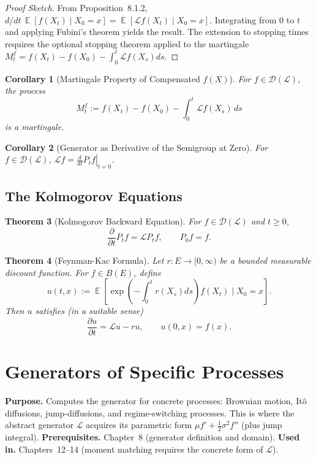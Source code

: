 \documentclass[11pt,a4paper,openany]{book}
\theoremstyle{definition}
\theoremstyle{plain}
\newtheorem{theorem}{Theorem}[chapter]
\newtheorem{corollary}[theorem]{Corollary}
\theoremstyle{remark}
\DeclareMathOperator{\E}{\mathbb{E}}
\newcommand{\1}{\mathbbm{1}}
\newcommand{\calL}{\mathcal{L}}
\newcommand{\calD}{\mathcal{D}}
\begin{document}
\begin{proof}[Proof Sketch]
From Proposition~8.1.2, $d/dt \, \E[f(X_{t}) \mid X_{0}=x] = \E[\calL f(X_{t}) \mid X_{0}=x]$. Integrating from $0$ to $t$ and applying Fubini's theorem yields the result. The extension to stopping times requires the optional stopping theorem applied to the martingale $M_{t}^{f} = f(X_{t}) - f(X_{0}) - \int_{0}^{t} \calL f(X_{s}) ds$.
\end{proof}

\begin{corollary}[Martingale Property of Compensated $f(X)$]
For $f \in \calD(\calL)$, the process
\[
M_{t}^{f} := f(X_{t}) - f(X_{0}) - \int_{0}^{t} \calL f(X_{s}) \, ds
\]
is a martingale.
\end{corollary}

\begin{corollary}[Generator as Derivative of the Semigroup at Zero]
For $f \in \calD(\calL)$, $\calL f = \left.\frac{d}{dt} P_{t} f\right|_{t=0}$.
\end{corollary}

\section{The Kolmogorov Equations}

\begin{theorem}[Kolmogorov Backward Equation]
For $f \in \calD(\calL)$ and $t \geq 0$,
\[
\frac{\partial}{\partial t} P_{t} f = \calL P_{t} f, \qquad P_{0}f = f.
\]
\end{theorem}

\begin{theorem}[Feynman-Kac Formula]
Let $r: E \to [0, \infty)$ be a bounded measurable discount function. For $f \in B(E)$, define
\[
u(t, x) := \E\left[\exp\left(-\int_{0}^{t} r(X_{s}) ds\right) f(X_{t}) \mid X_{0} = x\right].
\]
Then $u$ satisfies (in a suitable sense)
\[
\frac{\partial u}{\partial t} = \calL u - r u, \qquad u(0, x) = f(x).
\]
\end{theorem}

\chapter{Generators of Specific Processes}

\noindent\textbf{Purpose.} Computes the generator for concrete processes: Brownian motion, It\^{o} diffusions, jump-diffusions, and regime-switching processes. This is where the abstract generator $\mathcal{L}$ acquires its parametric form $\mu f' + \frac{1}{2}\sigma^{2} f''$ (plus jump integral).
\textbf{Prerequisites.} Chapter~8 (generator definition and domain).
\textbf{Used in.} Chapters~12--14 (moment matching requires the concrete form of $\mathcal{L}$).
\end{document}
